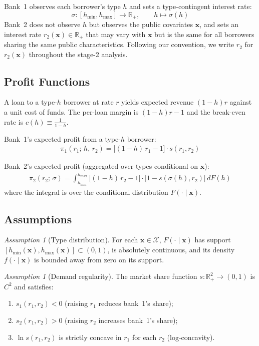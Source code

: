 \documentclass[12pt]{article}
\theoremstyle{plain}
\theoremstyle{plain}
\theoremstyle{definition}  %
\theoremstyle{remark}  %
\newtheorem{ass}[thm]{Assumption}
\begin{document}
Bank~1 observes each borrower's type $h$ and sets a type-contingent interest rate:
$$\sigma: [h_{\min}, h_{\max}] \to \mathbb{R}_+, \qquad h \mapsto \sigma(h)$$
Bank~2 does not observe $h$ but observes the public covariates $\mathbf{x}$, and sets an interest rate $r_2(\mathbf{x}) \in \mathbb{R}_+$ that may vary with $\mathbf{x}$ but is the same for all borrowers sharing the same public characteristics. Following our convention, we write $r_2$ for $r_2(\mathbf{x})$ throughout the stage-2 analysis.

\subsection{Profit Functions}

A loan to a type-$h$ borrower at rate $r$ yields expected revenue $(1-h)r$ against a unit cost of funds. The per-loan margin is $(1-h)r - 1$ and the break-even rate is $c(h) \equiv \frac{1}{1-h}$.

\medskip\noindent
Bank~1's expected profit from a type-$h$ borrower:
\begin{align}\label{eq:pi1}
    \pi_1(r_1;\, h,\, r_2) = \big[(1-h)\,r_1 - 1\big] \cdot s(r_1, r_2)
\end{align}

\medskip\noindent
Bank~2's expected profit (aggregated over types conditional on $\mathbf{x}$):
\begin{align}\label{eq:pi2}
    \pi_2(r_2;\, \sigma) = \int_{h_{\min}}^{h_{\max}} \big[(1-h)\,r_2 - 1\big] \cdot \big[1 - s(\sigma(h), r_2)\big] \, dF(h)
\end{align}
where the integral is over the conditional distribution $F(\cdot \mid \mathbf{x})$.

\subsection{Assumptions}

\begin{ass}[Type distribution]\label{ass:F}
For each $\mathbf{x} \in \mathcal{X}$, $F(\cdot \mid \mathbf{x})$ has support $[h_{\min}(\mathbf{x}), h_{\max}(\mathbf{x})] \subset (0,1)$, is absolutely continuous, and its density $f(\cdot \mid \mathbf{x})$ is bounded away from zero on its support.
\end{ass}

\begin{ass}[Demand regularity]\label{ass:demand}
The market share function $s: \mathbb{R}_+^2 \to (0,1)$ is $C^2$ and satisfies:
\begin{enumerate}
    \item[(i)] $s_1(r_1, r_2) < 0$ \quad (raising $r_1$ reduces bank~1's share);
    \item[(ii)] $s_2(r_1, r_2) > 0$ \quad (raising $r_2$ increases bank~1's share);
    \item[(iii)] $\ln s(r_1, r_2)$ is strictly concave in $r_1$ for each $r_2$ \quad (log-concavity).
\end{enumerate}
\end{ass}
\end{document}
